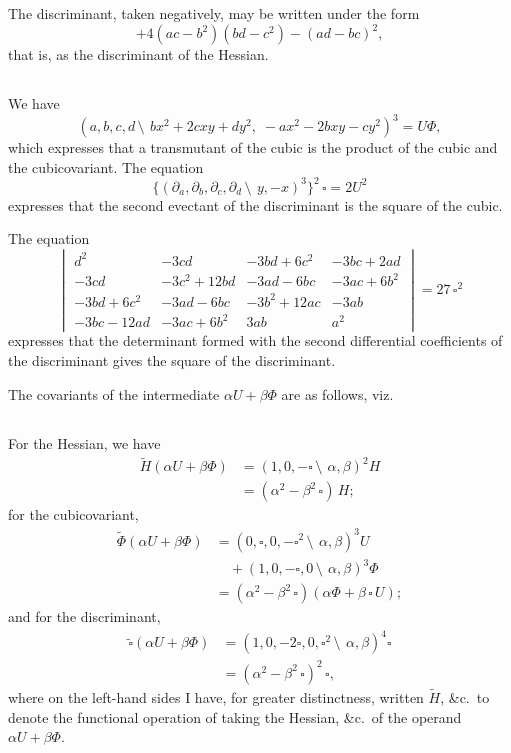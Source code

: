 \documentclass[11pt,a4paper]{book}
\begin{document}
\begin{center}
The discriminant, taken negatively, may be written under the form
\[
+4(ac - b^2)(bd - c^2) - (ad - bc)^2,
\]
that is, as the discriminant of the Hessian.

\subsection{}

We have
\[
(a, b, c, d\,\setminus\!\!\:\, bx^2 + 2cxy + dy^2,\; -ax^2 - 2bxy - cy^2)^3 = U\Phi,
\]
which expresses that a transmutant of the cubic is the product of the cubic and the cubicovariant. The equation
\[
\{(\partial_a, \partial_b, \partial_c, \partial_d\,\setminus\!\!\:\, y, -x)^3\}^2\,\square = 2U^2
\]
expresses that the second evectant of the discriminant is the square of the cubic.

The equation
\[
\begin{vmatrix}
d^2 & -3cd & -3bd + 6c^2 & -3bc + 2ad \\
-3cd & -3c^2 + 12bd & -3ad - 6bc & -3ac + 6b^2 \\
-3bd + 6c^2 & -3ad - 6bc & -3b^2 + 12ac & -3ab \\
-3bc - 12ad & -3ac + 6b^2 & 3ab & a^2
\end{vmatrix}
= 27\,\square^2
\]
expresses that the determinant formed with the second differential coefficients of the discriminant gives the square of the discriminant.

The covariants of the intermediate $\alpha U + \beta\Phi$ are as follows, viz.

\subsection{}

For the Hessian, we have
\begin{align*}
\tilde{H}(\alpha U + \beta\Phi) &= (1, 0, -\square\,\setminus\!\!\:\, \alpha, \beta)^2 H\\
&= (\alpha^2 - \beta^2\,\square)\,H;
\end{align*}
for the cubicovariant,
\begin{align*}
\tilde{\Phi}(\alpha U + \beta\Phi) &= (0, \square, 0, -\square^2\,\setminus\!\!\:\, \alpha, \beta)^3 U\\
&\quad + (1, 0, -\square, 0\,\setminus\!\!\:\, \alpha, \beta)^3 \Phi\\
&= (\alpha^2 - \beta^2\,\square)(\alpha\Phi + \beta\,\square\,U);
\end{align*}
and for the discriminant,
\begin{align*}
\tilde{\square}(\alpha U + \beta\Phi) &= (1, 0, -2\square, 0, \square^2\,\setminus\!\!\:\, \alpha, \beta)^4 \square\\
&= (\alpha^2 - \beta^2\,\square)^2\,\square,
\end{align*}
where on the left-hand sides I have, for greater distinctness, written $\tilde{H}$, \&c.\ to denote the functional operation of taking the Hessian, \&c.\ of the operand $\alpha U + \beta\Phi$.


\end{center}
\end{document}
